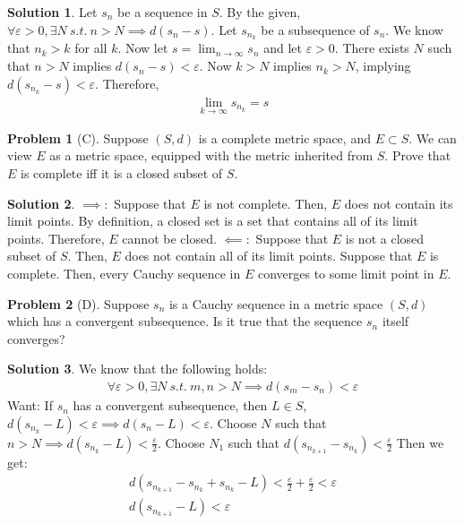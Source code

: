 \documentclass[12pt]{article}
\theoremstyle{definition} %
\newtheorem{solution}{Solution}
\newtheorem{problem}{Problem}
\theoremstyle{plain} %
\begin{document}
\begin{solution}
    Let $s_{n} $ be a sequence in $S$. By the given, $\forall \varepsilon >0,\exists N\ s.t. \ n>N\implies d(s_{n}-s)$. Let $s_{n_{k}} $ be a subsequence of $s_{n} $. We know that $n_{k} >k$ for all $k$. 
    Now let $s=\lim_{n \to \infty} s_{n} $ and let $\varepsilon >0$. There exists $N$ such that $n>N$ implies $d(s_{n} -s)<\varepsilon $. Now $k>N$ implies $n_{k} >N$, implying $d(s_{n_{k} }-s )<\varepsilon $. Therefore,
    \begin{align}
        \lim_{k \to \infty} s_{n_{k} }=s 
    \end{align}   
\end{solution}
\begin{problem}[C]
    Suppose $(S,d)$ is a complete metric space, and $E \subset S$. We can view $E$ as a metric space, equipped with the metric inherited from $S$. Prove that $E$ is complete iff it is a closed subset of $S$. 
\end{problem}

\begin{solution}
    $\implies :$ Suppose that $E$ is not complete. Then, $E$ does not contain its limit points. By definition, a closed set is a set that contains all of its limit points. Therefore, $E$ cannot be closed.
    $\impliedby :$ Suppose that $E$ is not a closed subset of $S$. Then, $E$ does not contain all of its limit points. Suppose that $E$ is complete. Then, every Cauchy sequence in $E$ converges to some limit point in $E$.
\end{solution}
\begin{problem}[D]
    Suppose $s_{n} $ is a Cauchy sequence in a metric space $(S,d)$ which has a convergent subsequence. Is it true that the sequence $s_{n} $ itself converges?
\end{problem}

\begin{solution}
   We know that the following holds:
   \begin{align}
    \forall \varepsilon >0, \exists N\ s.t. \ m,n>N\implies d(s_{m} -s_{n} )<\varepsilon 
   \end{align} 
   Want: If $s_{n} $ has a convergent subsequence, then $L\in S$, $d(s_{n_{k} }-L )<\varepsilon\implies d(s_{n} -L)<\varepsilon  $.
   Choose $N$ such that $n>N\implies d(s_{n_{k}  } -L)<\frac{\varepsilon}{2}$.
   Choose $N_{1} $ such that $d(s_{n_{k+1} }-s_{n_{k} }  )<\frac{\varepsilon}{2}$  
   Then we get:
   \begin{align}
    d(s_{n_{k+1} }-s_{n_{k} }+s_{n_{k} }-L   )<\frac{\varepsilon}{2}+\frac{\varepsilon}{2}<\varepsilon \\[10pt] 
    d(s_{n_{k+1} }-L )<\varepsilon 
   \end{align}
\end{solution}
\end{document}

